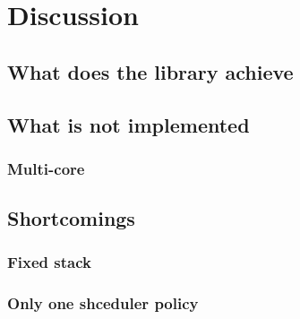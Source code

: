 
\chapter{Discussion}
\label{ch:discussion}


\section{What does the library achieve}
\section{What is not implemented}
\subsection{Multi-core}
\section{Shortcomings}
\subsection{Fixed stack}
\subsection{Only one shceduler policy}

